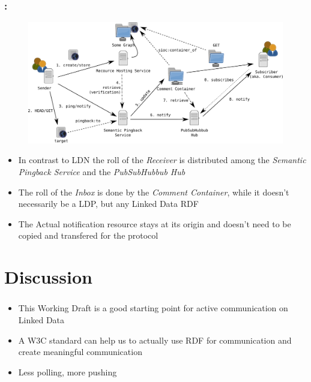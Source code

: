 \documentclass[aspectratio=169,hideallsubsections]{beamer}
\begin{document}
\begin{frame}
  \frametitle{\insertsection: \insertsubsection}%

    \begin{figure}
     \begin{center}
     \includegraphics[width=.8\textwidth]{StructuredFeedback/SF-1}
     \end{center}
    \end{figure}

    \begin{itemize}
    \tiny
     \item In contrast to LDN the roll of the \emph{Receiver} is distributed among the \emph{Semantic Pingback Service} and the \emph{PubSubHubbub Hub}
     \item The roll of the \emph{Inbox} is done by the \emph{Comment Container}, while it doesn't necessarily be a LDP, but any Linked Data RDF
     \item The Actual notification resource stays at its origin and doesn't need to be copied and transfered for the protocol
    \end{itemize}
    
\end{frame}


\section{Discussion}
\begin{frame}
  \frametitle{\insertsection}%

  \begin{itemize}
   \item This Working Draft is a good starting point for active communication on Linked Data
   \item A W3C standard can help us to actually use RDF for communication and create meaningful communication
   \item Less polling, more pushing
  \end{itemize}

\end{frame}
\end{document}
